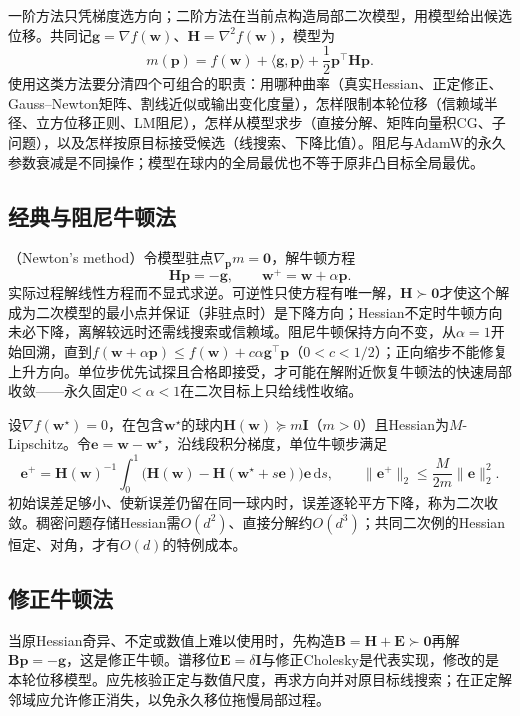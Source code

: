 一阶方法只凭梯度选方向；二阶方法在当前点构造局部二次模型，用模型给出候选位移。共同记$\bm g=\nabla f(\bm w)$、$\bm H=\nabla^2f(\bm w)$，模型为
\[
 m(\bm p)=f(\bm w)+\langle\bm g,\bm p\rangle+\frac12\bm p^\top\bm H\bm p.
\]
使用这类方法要分清四个可组合的职责：用哪种曲率（真实Hessian、正定修正、Gauss--Newton矩阵、割线近似或输出变化度量），怎样限制本轮位移（信赖域半径、立方位移正则、LM阻尼），怎样从模型求步（直接分解、矩阵向量积CG、子问题），以及怎样按原目标接受候选（线搜索、下降比值）。阻尼与AdamW的永久参数衰减是不同操作；模型在球内的全局最优也不等于原非凸目标全局最优。

\subsection{经典与阻尼牛顿法}

（Newton's method）令模型驻点$\nabla_{\bm p}m=\bm0$，解牛顿方程
\[
 \bm H\bm p=-\bm g,\qquad
 \bm w^{+}=\bm w+\alpha\bm p.
\]
实际过程解线性方程而不显式求逆。可逆性只使方程有唯一解，$\bm H\succ\bm0$才使这个解成为二次模型的最小点并保证（非驻点时）是下降方向；Hessian不定时牛顿方向未必下降，离解较远时还需线搜索或信赖域。阻尼牛顿保持方向不变，从$\alpha=1$开始回溯，直到$f(\bm w+\alpha\bm p)\leq f(\bm w)+c\alpha\bm g^\top\bm p$（$0<c<1/2$）；正向缩步不能修复上升方向。单位步优先试探且合格即接受，才可能在解附近恢复牛顿法的快速局部收敛——永久固定$0<\alpha<1$在二次目标上只给线性收缩。

设$\nabla f(\bm w^\star)=0$，在包含$\bm w^\star$的球内$\bm H(\bm w)\succeq m\bm I$（$m>0$）且Hessian为$M$-Lipschitz。令$\bm e=\bm w-\bm w^\star$，沿线段积分梯度，单位牛顿步满足
\[
 \bm e^+=\bm H(\bm w)^{-1}\int_0^1
 \bigl(\bm H(\bm w)-\bm H(\bm w^\star+s\bm e)\bigr)\bm e\,\mathrm ds,
 \qquad
 \|\bm e^+\|_2\leq\frac{M}{2m}\|\bm e\|_2^2.
\]
初始误差足够小、使新误差仍留在同一球内时，误差逐轮平方下降，称为二次收敛。稠密问题存储Hessian需$O(d^2)$、直接分解约$O(d^3)$；共同二次例的Hessian恒定、对角，才有$O(d)$的特例成本。

\subsection{修正牛顿法}

当原Hessian奇异、不定或数值上难以使用时，先构造$\bm B=\bm H+\bm E\succ\bm0$再解$\bm B\bm p=-\bm g$，这是修正牛顿。谱移位$\bm E=\delta\bm I$与修正Cholesky是代表实现，修改的是本轮位移模型。应先核验正定与数值尺度，再求方向并对原目标线搜索；在正定解邻域应允许修正消失，以免永久移位拖慢局部过程。

